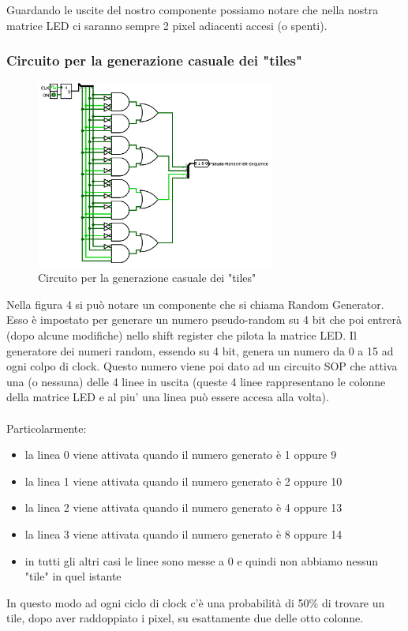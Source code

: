 \documentclass[11pt]{article}
\begin{document}
Guardando le uscite del nostro componente possiamo notare che nella nostra matrice LED ci saranno sempre 2 pixel adiacenti accesi (o spenti).
\pagebreak
\subsubsection{Circuito per la generazione casuale dei "tiles"}

\begin{figure}[!htpb]
\centering
\includegraphics[width=0.7\textwidth, center]{immagini/circuito_tiles}
\caption{Circuito per la generazione casuale dei "tiles"}
\label{fig:fig4}
\end{figure}

Nella figura 4 si può notare un componente che si chiama Random Generator. Esso è impostato
per generare un numero pseudo-random su 4 bit che poi entrerà (dopo alcune modifiche) nello shift 
register che pilota la matrice LED.
Il generatore dei numeri random, essendo su 4 bit, genera un numero da 0 a 15 ad ogni colpo di clock.
Questo numero viene poi dato ad un circuito SOP che attiva una (o nessuna) delle 4 linee in uscita (queste
4 linee rappresentano le colonne della matrice LED e al piu' una linea può essere accesa alla volta). 
\\
\\Particolarmente:
\begin{itemize}
\item la linea 0 viene attivata quando il numero generato è 1 oppure 9
\item la linea 1 viene attivata quando il numero generato è 2 oppure 10
\item la linea 2 viene attivata quando il numero generato è 4 oppure 13
\item la linea 3 viene attivata quando il numero generato è 8 oppure 14
\item in tutti gli altri casi le linee sono messe a 0 e quindi non abbiamo nessun "tile" in quel istante
\end{itemize}
In questo modo ad ogni ciclo di clock c'è una probabilità  di 50\% di trovare un tile, dopo aver raddoppiato i pixel, su esattamente due delle otto colonne.
\end{document}
